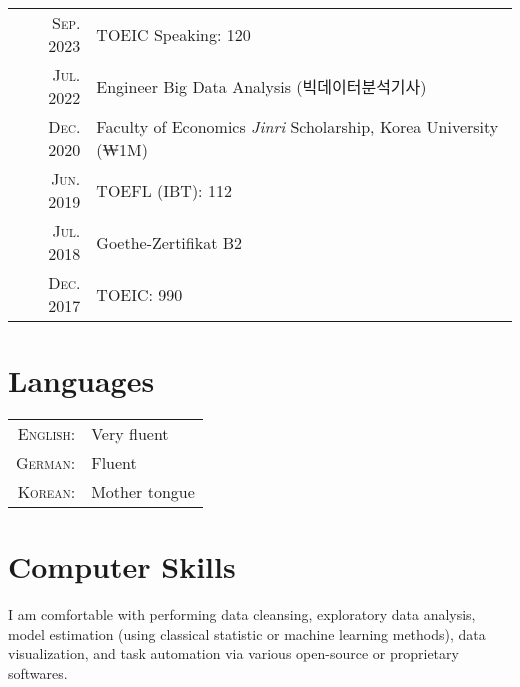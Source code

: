 \documentclass[a4paper,10pt]{article} %
\begin{document}
\begin{tabular}{rl}
    \textsc{Sep.} 2023 & TOEIC Speaking: 120 \\

    \textsc{Jul.} 2022 & Engineer Big Data Analysis (빅데이터분석기사)\\

    \textsc{Dec.} 2020 & Faculty of Economics \textit{Jinri} Scholarship, Korea
    University
    \footnotesize(₩1M)\normalsize\\

    \textsc{Jun.} 2019 & TOEFL (IBT): 112\\

    \textsc{Jul.} 2018 & Goethe-Zertifikat B2\\

    \textsc{Dec.} 2017 & TOEIC: 990\\
\end{tabular}

\section{Languages}

\begin{tabular}{rl}
    \textsc{English:} & Very fluent\\

    \textsc{German:} & Fluent\\

    \textsc{Korean:} & Mother tongue\\
\end{tabular}


\section{Computer Skills}

I am comfortable with performing data cleansing, exploratory data analysis,
model estimation (using classical statistic or machine learning methods),
data visualization, and task automation via various open-source or proprietary
softwares.
\end{document}
